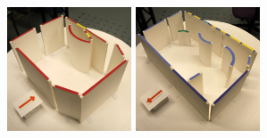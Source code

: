 \begin{figure}[t]
\begin{minipage}[c]{3.in}
  \includegraphics[width=1.45in]{../gi2012_userstudy/images/photos/38_renovation} %
  \includegraphics[width=1.45in]{../gi2012_userstudy/images/photos/42_renovation} %
\end{minipage}
\begin{minipage}[c]{4.7in}


\end{minipage}
\end{figure}
